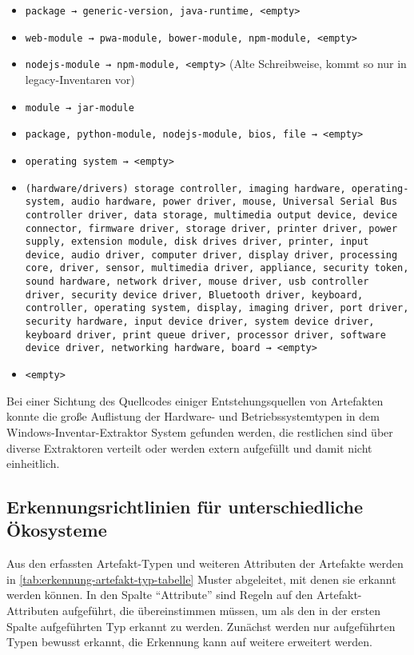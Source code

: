 \begin{itemize}
    \itemsep0em

    \item \texttt{package → generic-version, java-runtime, <empty>}
    \item \texttt{web-module → pwa-module, bower-module, npm-module, <empty>}
    \item \texttt{nodejs-module → npm-module, <empty>} (Alte Schreibweise, kommt so nur in legacy-Inventaren vor)
    \item \texttt{module → jar-module}
    \item \texttt{package, python-module, nodejs-module, bios, file → <empty>}
    \item \texttt{operating system → <empty>}
    \item \texttt{(hardware/drivers) storage controller, imaging hardware, operating-system, audio hardware, power driver, mouse, Universal Serial Bus controller driver, data storage, multimedia output device, device connector, firmware driver, storage driver, printer driver, power supply, extension module, disk drives driver, printer, input device, audio driver, computer driver, display driver, processing core, driver, sensor, multimedia driver, appliance, security token, sound hardware, network driver, mouse driver, usb controller driver, security device driver, Bluetooth driver, keyboard, controller, operating system, display, imaging driver, port driver, security hardware, input device driver, system device driver, keyboard driver, print queue driver, processor driver, software device driver, networking hardware, board → <empty>}
    \item \texttt{<empty>}
\end{itemize}

Bei einer Sichtung des Quellcodes einiger Entstehungsquellen von Artefakten konnte die große Auflistung der Hardware- und Betriebssystemtypen in dem Windows-Inventar-Extraktor System gefunden werden, die restlichen sind über diverse Extraktoren verteilt oder werden extern aufgefüllt und damit nicht einheitlich.

\subsection{Erkennungsrichtlinien für unterschiedliche Ökosysteme}\label{subsec:erkennung-typspezifische-artefakte}

Aus den erfassten Artefakt-Typen und weiteren Attributen der Artefakte werden in \autoref{tab:erkennung-artefakt-typ-tabelle} Muster abgeleitet, mit denen sie erkannt werden können.
In den Spalte \enquote{Attribute} sind Regeln auf den Artefakt-Attributen aufgeführt, die übereinstimmen müssen, um als den in der ersten Spalte aufgeführten Typ erkannt zu werden.
Zunächst werden nur aufgeführten Typen bewusst erkannt, die Erkennung kann auf weitere erweitert werden.


